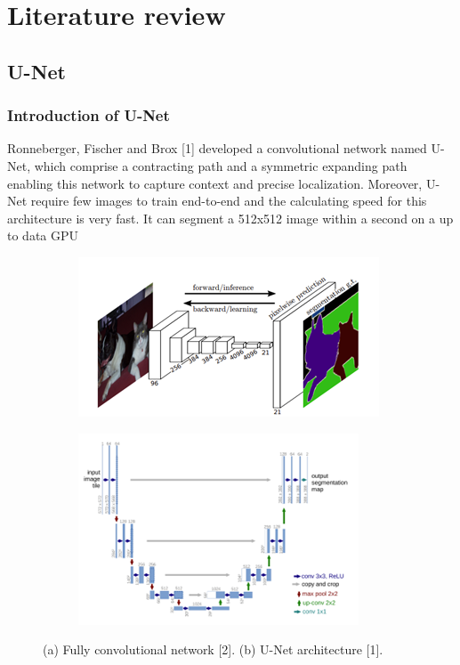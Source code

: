 \documentclass[conference]{IEEEtran}
\begin{document}
\section{Literature review}
\subsection{U-Net}
\subsubsection{Introduction of U-Net}
Ronneberger, Fischer and Brox [1] developed a convolutional network named U-Net, which comprise a contracting path and a symmetric expanding path enabling this network to capture context and precise localization. Moreover, U-Net require few images to train end-to-end and the calculating speed for this architecture is very fast. It can segment a 512x512 image within a second on a up to data GPU
\begin{figure}[h]
    \centering
    \begin{subfigure}[t]{0.23\textwidth}
        \centering
        \includegraphics[width=\textwidth]{group/Picture1.png}
    \end{subfigure}%
    \hfill
    \begin{subfigure}[t]{0.23\textwidth}
        \centering
        \includegraphics[width=\textwidth]{group/Picture2.png}
    \end{subfigure}
    \caption{(a) Fully convolutional network [2]. (b) U-Net architecture [1].}
\end{figure}
\end{document}
